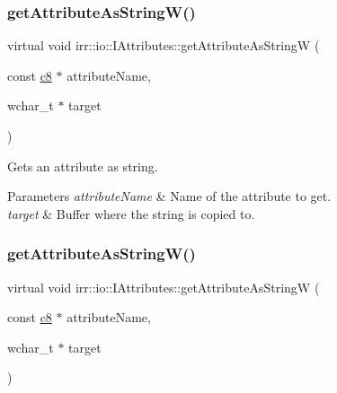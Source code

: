 \subsubsection{\texorpdfstring{get\+Attribute\+As\+String\+W()}{getAttributeAsStringW()}\hspace{0.1cm}{\footnotesize\ttfamily [3/6]}}
{\footnotesize\ttfamily virtual void irr\+::io\+::\+I\+Attributes\+::get\+Attribute\+As\+StringW (\begin{DoxyParamCaption}\item[{const \hyperlink{namespaceirr_a9395eaea339bcb546b319e9c96bf7410}{c8} $\ast$}]{attribute\+Name,  }\item[{wchar\+\_\+t $\ast$}]{target }\end{DoxyParamCaption})\hspace{0.3cm}{\ttfamily [pure virtual]}}



Gets an attribute as string. 


\begin{DoxyParams}{Parameters}
{\em attribute\+Name} & Name of the attribute to get. \\
\hline
{\em target} & Buffer where the string is copied to. \\
\hline
\end{DoxyParams}
\mbox{\label{classirr_1_1io_1_1IAttributes_a972aca66779e767e635a1c52b1559382}} 
\subsubsection{\texorpdfstring{get\+Attribute\+As\+String\+W()}{getAttributeAsStringW()}\hspace{0.1cm}{\footnotesize\ttfamily [4/6]}}
{\footnotesize\ttfamily virtual void irr\+::io\+::\+I\+Attributes\+::get\+Attribute\+As\+StringW (\begin{DoxyParamCaption}\item[{const \hyperlink{namespaceirr_a9395eaea339bcb546b319e9c96bf7410}{c8} $\ast$}]{attribute\+Name,  }\item[{wchar\+\_\+t $\ast$}]{target }\end{DoxyParamCaption})\hspace{0.3cm}{\ttfamily [pure virtual]}}



